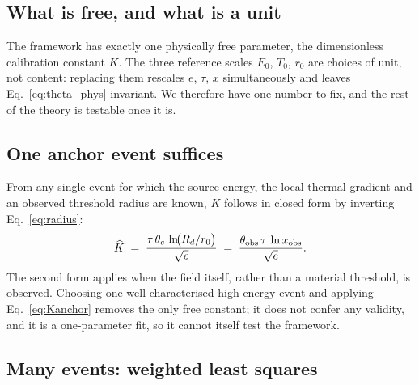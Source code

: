 \documentclass[11pt,a4paper]{article}
\newcommand{\tgrad}{\tau}
\begin{document}
\subsection{What is free, and what is a unit}

The framework has exactly one physically free parameter, the dimensionless
calibration constant $K$. The three reference scales $E_0$, $T_0$, $r_0$ are
choices of unit, not content: replacing them rescales $e$, $\tgrad$, $x$
simultaneously and leaves Eq.~\eqref{eq:theta_phys} invariant. We therefore
have one number to fix, and the rest of the theory is testable once it is.

\subsection{One anchor event suffices}

From any single event for which the source energy, the local thermal gradient
and an observed threshold radius are known, $K$ follows in closed form by
inverting Eq.~\eqref{eq:radius}:
\begin{equation}
  \widehat{K}
  \;=\; \frac{\tgrad\,\theta_c\,\ln\!\bigl(R_d/r_0\bigr)}{\sqrt{e}}
  \;=\; \frac{\theta_{\rm obs}\,\tgrad\,\ln x_{\rm obs}}{\sqrt{e}} .
  \label{eq:Kanchor}
\end{equation}
The second form applies when the field itself, rather than a material
threshold, is observed. Choosing one well-characterised high-energy event and
applying Eq.~\eqref{eq:Kanchor} removes the only free constant; it does not
confer any validity, and it is a one-parameter fit, so it cannot itself test
the framework.

\subsection{Many events: weighted least squares}
\end{document}
